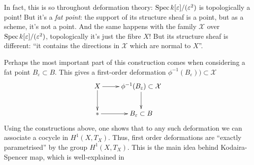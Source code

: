 In fact, this is so throughout deformation
theory:
$\mathop{\mathrm{Spec}} k[\varepsilon]/(\varepsilon^2)$ is
topologically a point!
But it's a {\it fat point}: the support of
its
structure sheaf is a point, but as a scheme,
it's not a point.
And the same happens with the family
$\mathcal{X}$ over
$\mathop{\mathrm{Spec}} k[\varepsilon]/(\varepsilon^2)$,
topologically it's just the fibre $X$!
But its structure sheaf is different:
``it contains the directions in $\mathcal{X}$
which
are normal to $X$''.

\medskip\noindent
Perhaps the most important part of this
construction
comes when considering a fat point
$B_\varepsilon \subset B$.
This gives a first-order deformation
$\phi^{-1}(B_\varepsilon)) \subset
\mathcal{X}$
$$
\xymatrix{
X\ar[r]\ar[d]
&\phi^{-1}(B_\varepsilon) \subset
\mathcal{X}\ar[d]\\
\ast\ar[r]
&B_\varepsilon \subset B
}
$$
Using the constructions above, one shows that
to any such deformation we can associate a
cocycle
in $H^1(X,T_X)$.
Thus, first order deformations are ``exactly
parametrised''
by the group $H^1(X,T_X)$.
This is the main idea behind Kodaira-Spencer
map,
which is well-explained in
